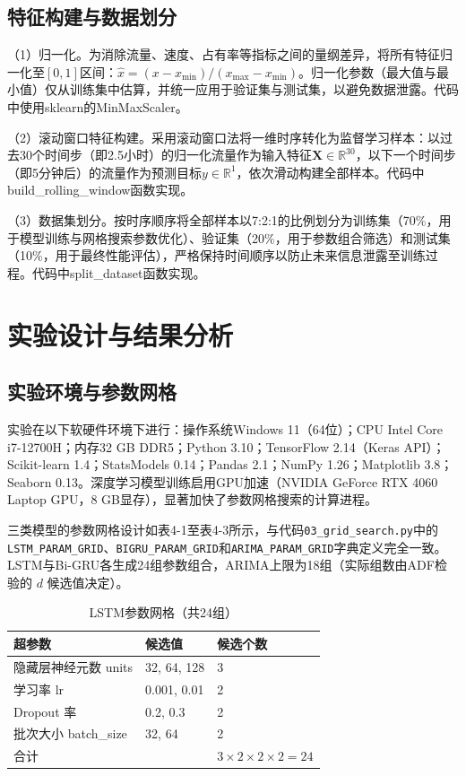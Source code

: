\documentclass[12pt,a4paper,oneside]{ctexbook}
\begin{document}
	\section{特征构建与数据划分}
	（1）归一化。为消除流量、速度、占有率等指标之间的量纲差异，将所有特征归一化至\([0,1]\)区间：\(\hat{x} = (x - x_{\min})/(x_{\max} - x_{\min})\)。归一化参数（最大值与最小值）仅从训练集中估算，并统一应用于验证集与测试集，以避免数据泄露。代码中使用sklearn的MinMaxScaler。
	
	（2）滚动窗口特征构建。采用滚动窗口法将一维时序转化为监督学习样本：以过去30个时间步（即2.5小时）的归一化流量作为输入特征\(\mathbf{X}\in\mathbb{R}^{30}\)，以下一个时间步（即5分钟后）的流量作为预测目标\(y\in\mathbb{R}^1\)，依次滑动构建全部样本。代码中build\_rolling\_window函数实现。
	
	（3）数据集划分。按时序顺序将全部样本以7:2:1的比例划分为训练集（70\%，用于模型训练与网格搜索参数优化）、验证集（20\%，用于参数组合筛选）和测试集（10\%，用于最终性能评估），严格保持时间顺序以防止未来信息泄露至训练过程。代码中split\_dataset函数实现。
	
	\chapter{实验设计与结果分析}
	
	\section{实验环境与参数网格}
	实验在以下软硬件环境下进行：操作系统Windows 11（64位）；CPU Intel Core i7-12700H；内存32 GB DDR5；Python 3.10；TensorFlow 2.14（Keras API）；Scikit-learn 1.4；StatsModels 0.14；Pandas 2.1；NumPy 1.26；Matplotlib 3.8；Seaborn 0.13。深度学习模型训练启用GPU加速（NVIDIA GeForce RTX 4060 Laptop GPU，8 GB显存），显著加快了参数网格搜索的计算进程。
	
	三类模型的参数网格设计如表4-1至表4-3所示，与代码\texttt{03\_grid\_search.py}中的\texttt{LSTM\_PARAM\_GRID}、\texttt{BIGRU\_PARAM\_GRID}和\texttt{ARIMA\_PARAM\_GRID}字典定义完全一致。LSTM与Bi-GRU各生成24组参数组合，ARIMA上限为18组（实际组数由ADF检验的 $d$ 候选值决定）。
	
	\begin{table}[H]
		\centering
		\caption{LSTM参数网格（共24组）}
		\label{tab:lstm_grid}
		\begin{tabular}{lll}
			\toprule
			超参数 & 候选值 & 候选个数 \\
			\midrule
			隐藏层神经元数 units & 32, 64, 128 & 3 \\
			学习率 lr          & 0.001, 0.01 & 2 \\
			Dropout 率         & 0.2, 0.3    & 2 \\
			批次大小 batch\_size & 32, 64      & 2 \\
			\midrule
			\multicolumn{2}{l}{合计} & $3\times2\times2\times2=24$ \\
			\bottomrule
		\end{tabular}
	\end{table}
	
\end{document}
